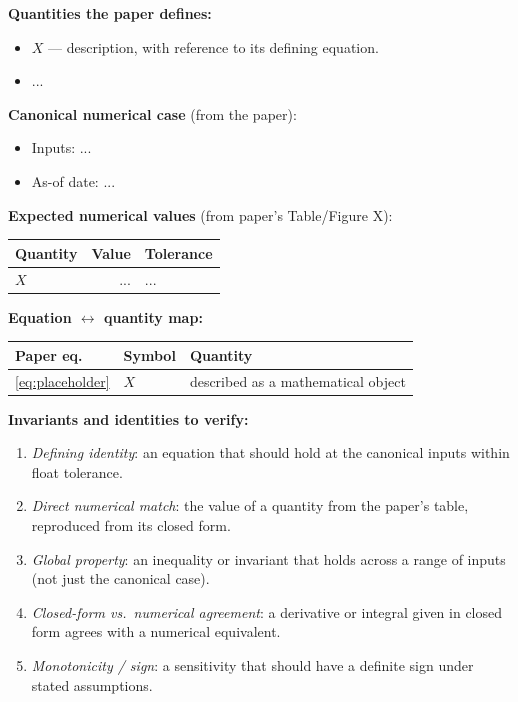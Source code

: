 \documentclass[11pt,a4paper]{article}
\begin{document}
\begin{validation}

\textbf{Quantities the paper defines:}
\begin{itemize}[noitemsep]
  \item $X$ --- description, with reference to its defining equation.
  \item ...
\end{itemize}

\textbf{Canonical numerical case} (from the paper):
\begin{itemize}[noitemsep]
  \item Inputs: ...
  \item As-of date: ...
\end{itemize}

\textbf{Expected numerical values} (from paper's Table/Figure X):

\smallskip
\begin{tabular}{@{}p{6cm}rl@{}}
\toprule
Quantity & Value & Tolerance \\
\midrule
$X$ & ... & ... \\
\bottomrule
\end{tabular}
\smallskip

\textbf{Equation $\leftrightarrow$ quantity map:}

\smallskip
\begin{tabular}{@{}p{2.8cm}p{4cm}p{6cm}@{}}
\toprule
Paper eq. & Symbol & Quantity \\
\midrule
\eqref{eq:placeholder} & $X$ & described as a mathematical object \\
\bottomrule
\end{tabular}
\smallskip

\textbf{Invariants and identities to verify:}
\begin{enumerate}[noitemsep]
  \item \emph{Defining identity}: an equation that should hold at the
        canonical inputs within float tolerance.
  \item \emph{Direct numerical match}: the value of a quantity from the
        paper's table, reproduced from its closed form.
  \item \emph{Global property}: an inequality or invariant that holds
        across a range of inputs (not just the canonical case).
  \item \emph{Closed-form vs.\ numerical agreement}: a derivative or
        integral given in closed form agrees with a numerical equivalent.
  \item \emph{Monotonicity / sign}: a sensitivity that should have a
        definite sign under stated assumptions.
\end{enumerate}
\end{validation}
\end{document}
